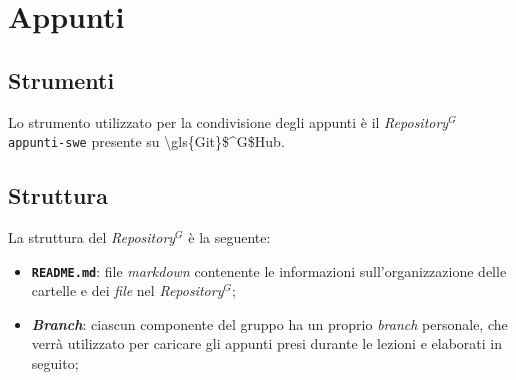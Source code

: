 \section{Appunti}

\subsection{Strumenti}

Lo strumento utilizzato per la condivisione degli appunti è il
\textit{\gls{Repository}$^G$} \texttt{appunti-swe} presente su \gls{\gls{Git}$^G$Hub}.

\subsection{Struttura}

La struttura del \textit{\gls{Repository}$^G$} è la seguente:
\begin{itemize}
	\item \textbf{\texttt{README.md}}: file \textit{markdown} contenente le
	      informazioni sull'organizzazione delle cartelle e dei \textit{file}
	      nel \textit{\gls{Repository}$^G$};

	\item \textbf{\textit{Branch}}: ciascun componente del gruppo ha un proprio
	      \textit{branch} personale, che verrà utilizzato per caricare gli
	      appunti presi durante le lezioni e elaborati in seguito;
\end{itemize}
